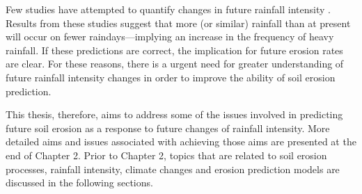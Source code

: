Few studies have attempted to quantify changes in future rainfall intensity
\citep{karl1995-217,houghton1996-climate,watson1998-517,karl1998-231,
osborn1998-505,osborn2002-1313}. Results from these studies suggest that more
(or similar) rainfall than at present will occur on fewer raindays---implying an
increase in the frequency of heavy rainfall. If these predictions are correct,
the implication for future erosion rates are clear. For these reasons, there is
a urgent need for greater understanding of future rainfall intensity changes in
order to improve the ability of soil erosion prediction.

This thesis, therefore, aims to address some of the issues involved in
predicting future soil erosion as a response to future changes of rainfall
intensity. More detailed aims and issues associated with achieving those aims
are presented at the end of Chapter 2. Prior to Chapter 2, topics that are
related to soil erosion processes, rainfall intensity, climate changes and
erosion prediction models are discussed in the following sections.






